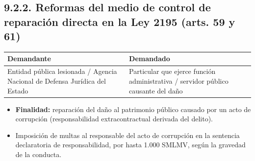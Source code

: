 \subsection{9.2.2. Reformas del medio de control de reparación directa en la Ley 2195 (arts. 59 y 61)}
\begin{tabla}
\begin{longtable}{|>{\raggedright\arraybackslash}m{}|>{\raggedright\arraybackslash}m{}|}
\hline
\cellcolor[HTML]{1F3864}\textcolor[HTML]{FFFFFF}{\textbf{Demandante}} & \cellcolor[HTML]{1F3864}\textcolor[HTML]{FFFFFF}{\textbf{Demandado}} \\ \hline
Entidad pública lesionada / Agencia Nacional de Defensa Jurídica del Estado & Particular que ejerce función administrativa / servidor público causante del daño \\ \hline
\end{longtable}
\end{tabla}
\begin{itemize}
\item \textbf{Finalidad:} reparación del daño al patrimonio público causado por un acto de corrupción (responsabilidad extracontractual derivada del delito).
\item Imposición de multas al responsable del acto de corrupción en la sentencia declaratoria de responsabilidad, por hasta 1.000 SMLMV, según la gravedad de la conducta.
\end{itemize}
